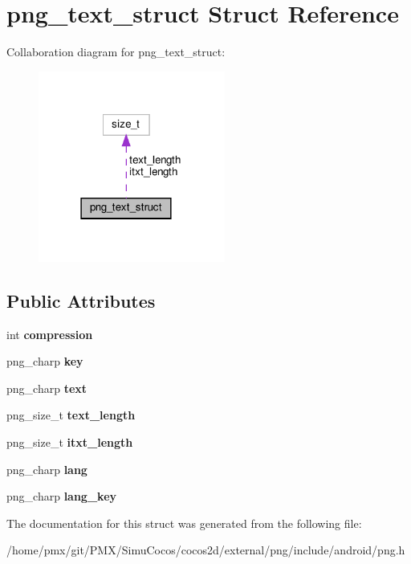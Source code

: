 \hypertarget{structpng__text__struct}{}\section{png\+\_\+text\+\_\+struct Struct Reference}
\label{structpng__text__struct}


Collaboration diagram for png\+\_\+text\+\_\+struct\+:
\nopagebreak
\begin{figure}[H]
\begin{center}
\leavevmode
\includegraphics[width=174pt]{structpng__text__struct__coll__graph}
\end{center}
\end{figure}
\subsection*{Public Attributes}
\begin{DoxyCompactItemize}
\item 
\mbox{\label{structpng__text__struct_ad09c73bc91f014ad352abfbb3b61b8d1}} 
int {\bfseries compression}
\item 
\mbox{\label{structpng__text__struct_a99c3063a15889d2fc242f24b69c567ef}} 
png\+\_\+charp {\bfseries key}
\item 
\mbox{\label{structpng__text__struct_a27492227bc525bee14abcc8002084edd}} 
png\+\_\+charp {\bfseries text}
\item 
\mbox{\label{structpng__text__struct_a26312284ecc7a95e2168a29d0170b411}} 
png\+\_\+size\+\_\+t {\bfseries text\+\_\+length}
\item 
\mbox{\label{structpng__text__struct_aca3fd6fec58f54460d57ad07182d570d}} 
png\+\_\+size\+\_\+t {\bfseries itxt\+\_\+length}
\item 
\mbox{\label{structpng__text__struct_a803048cbecc84ca530d64db6513f4fc6}} 
png\+\_\+charp {\bfseries lang}
\item 
\mbox{\label{structpng__text__struct_a61ee3cba011cf3bdefda49f8f9885482}} 
png\+\_\+charp {\bfseries lang\+\_\+key}
\end{DoxyCompactItemize}


The documentation for this struct was generated from the following file\+:\begin{DoxyCompactItemize}
\item 
/home/pmx/git/\+P\+M\+X/\+Simu\+Cocos/cocos2d/external/png/include/android/png.\+h\end{DoxyCompactItemize}

